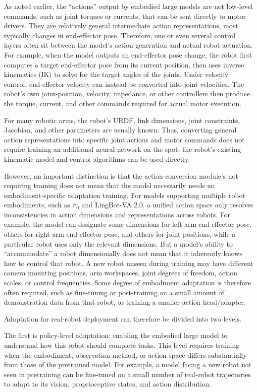 As noted earlier, the ``actions'' output by embodied large models are not low-level commands, such as joint torques or currents, that can be sent directly to motor drivers. They are relatively general intermediate action representations, most typically changes in end-effector pose. Therefore, one or even several control layers often sit between the model's action generation and actual robot actuation. For example, when the model outputs an end-effector pose change, the robot first computes a target end-effector pose from its current position, then uses inverse kinematics (IK) to solve for the target angles of the joints. Under velocity control, end-effector velocity can instead be converted into joint velocities. The robot's own joint-position, velocity, impedance, or other controllers then produce the torque, current, and other commands required for actual motor execution.

For many robotic arms, the robot's URDF, link dimensions, joint constraints, Jacobian, and other parameters are usually known. Thus, converting general action representations into specific joint actions and motor commands does not require training an additional neural network on the spot; the robot's existing kinematic model and control algorithms can be used directly.

However, an important distinction is that the action-conversion module's not requiring training does not mean that the model necessarily needs no embodiment-specific adaptation training. For models supporting multiple robot embodiments, such as \(\pi_0\) and LingBot-VA 2.0, a unified action space only resolves inconsistencies in action dimensions and representations across robots. For example, the model can designate some dimensions for left-arm end-effector pose, others for right-arm end-effector pose, and others for joint positions, while a particular robot uses only the relevant dimensions. But a model's ability to ``accommodate'' a robot dimensionally does not mean that it inherently knows how to control that robot. A new robot unseen during training may have different camera mounting positions, arm workspaces, joint degrees of freedom, action scales, or control frequencies. Some degree of embodiment adaptation is therefore often required, such as fine-tuning or post-training on a small amount of demonstration data from that robot, or training a smaller action head/adapter.

Adaptation for real-robot deployment can therefore be divided into two levels.

The first is policy-level adaptation: enabling the embodied large model to understand how this robot should complete tasks. This level requires training when the embodiment, observation method, or action space differs substantially from those of the pretrained model. For example, a model facing a new robot not seen in pretraining can be fine-tuned on a small number of real-robot trajectories to adapt to its vision, proprioceptive states, and action distribution.

